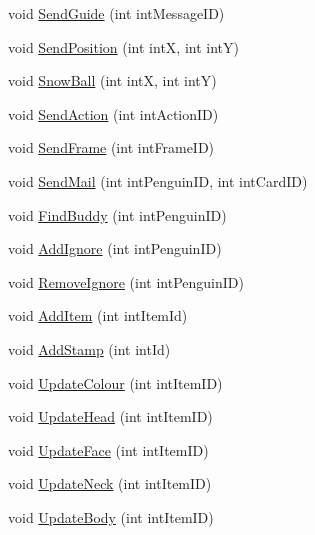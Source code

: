 \begin{DoxyCompactItemize}
\item 
void \hyperlink{classSharpenguin_1_1Tasks_a6c32c1c6f88de4fbd9cf85f2082569dd}{Send\-Guide} (int int\-Message\-I\-D)
\item 
void \hyperlink{classSharpenguin_1_1Tasks_a42de1c57af7ccf4d72a4a0acef7f35fb}{Send\-Position} (int int\-X, int int\-Y)
\item 
void \hyperlink{classSharpenguin_1_1Tasks_abb4b5e0ca0e3f8c075e647bce8e667de}{Snow\-Ball} (int int\-X, int int\-Y)
\item 
void \hyperlink{classSharpenguin_1_1Tasks_a247a2b0d766f9320292ed5b50475a8a7}{Send\-Action} (int int\-Action\-I\-D)
\item 
void \hyperlink{classSharpenguin_1_1Tasks_ae2befef95a890b44ce44d9add9b80608}{Send\-Frame} (int int\-Frame\-I\-D)
\item 
void \hyperlink{classSharpenguin_1_1Tasks_aeff19dc4bd2712ffe0fc78e7cabde77a}{Send\-Mail} (int int\-Penguin\-I\-D, int int\-Card\-I\-D)
\item 
void \hyperlink{classSharpenguin_1_1Tasks_a523d2f30e39ad9fa7fe8193988328da1}{Find\-Buddy} (int int\-Penguin\-I\-D)
\item 
void \hyperlink{classSharpenguin_1_1Tasks_a236f5a74ad03fe12aed14a3f6bc14508}{Add\-Ignore} (int int\-Penguin\-I\-D)
\item 
void \hyperlink{classSharpenguin_1_1Tasks_aad982d7afbc325866a8e55082681d1e7}{Remove\-Ignore} (int int\-Penguin\-I\-D)
\item 
void \hyperlink{classSharpenguin_1_1Tasks_a271205c07c2db320e88bc7ec1a521e07}{Add\-Item} (int int\-Item\-Id)
\item 
void \hyperlink{classSharpenguin_1_1Tasks_a887ba34c2cdf0af891ef8287916ea8b7}{Add\-Stamp} (int int\-Id)
\item 
void \hyperlink{classSharpenguin_1_1Tasks_a71f9653e2af4320db4c1f555736ed1cf}{Update\-Colour} (int int\-Item\-I\-D)
\item 
void \hyperlink{classSharpenguin_1_1Tasks_ab06db75f7a16272eb8219a4b3bf3d5fd}{Update\-Head} (int int\-Item\-I\-D)
\item 
void \hyperlink{classSharpenguin_1_1Tasks_a6d34a7c74eac78f8f8dc46bdb1ee1059}{Update\-Face} (int int\-Item\-I\-D)
\item 
void \hyperlink{classSharpenguin_1_1Tasks_a3099ae42806c87c9f0e7ef80fdbb4265}{Update\-Neck} (int int\-Item\-I\-D)
\item 
void \hyperlink{classSharpenguin_1_1Tasks_a5c9613fab22dd04c2327499057ec7b0a}{Update\-Body} (int int\-Item\-I\-D)
\item 

\end{DoxyCompactItemize}
